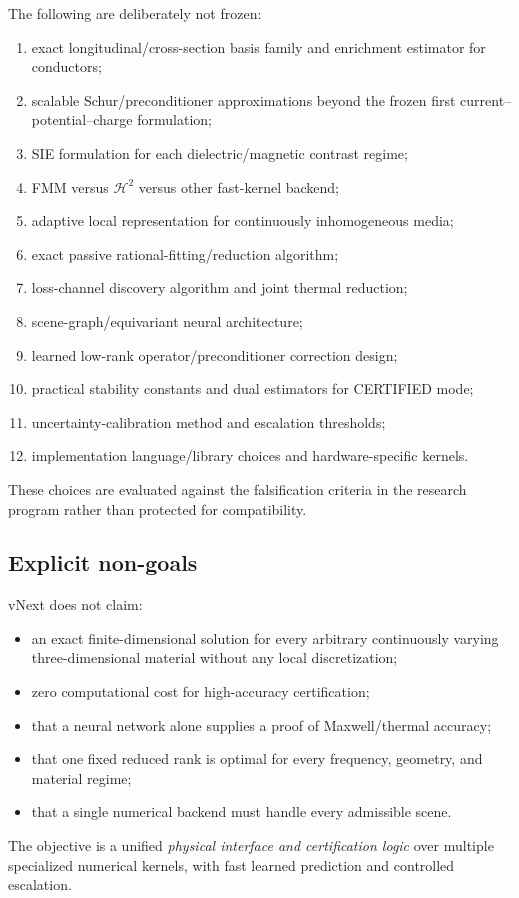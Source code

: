 The following are deliberately not frozen:
\begin{enumerate}
\item exact longitudinal/cross-section basis family and enrichment estimator for
      conductors;
\item scalable Schur/preconditioner approximations beyond the frozen first
      current--potential--charge formulation;
\item SIE formulation for each dielectric/magnetic contrast regime;
\item FMM versus $\mathcal H^2$ versus other fast-kernel backend;
\item adaptive local representation for continuously inhomogeneous media;
\item exact passive rational-fitting/reduction algorithm;
\item loss-channel discovery algorithm and joint thermal reduction;
\item scene-graph/equivariant neural architecture;
\item learned low-rank operator/preconditioner correction design;
\item practical stability constants and dual estimators for CERTIFIED mode;
\item uncertainty-calibration method and escalation thresholds;
\item implementation language/library choices and hardware-specific kernels.
\end{enumerate}

These choices are evaluated against the falsification criteria in the research
program rather than protected for compatibility.

\subsection{Explicit non-goals}

vNext does not claim:
\begin{itemize}
\item an exact finite-dimensional solution for every arbitrary continuously
      varying three-dimensional material without any local discretization;
\item zero computational cost for high-accuracy certification;
\item that a neural network alone supplies a proof of Maxwell/thermal accuracy;
\item that one fixed reduced rank is optimal for every frequency, geometry, and
      material regime;
\item that a single numerical backend must handle every admissible scene.
\end{itemize}

The objective is a unified \emph{physical interface and certification logic}
over multiple specialized numerical kernels, with fast learned prediction and
controlled escalation.
